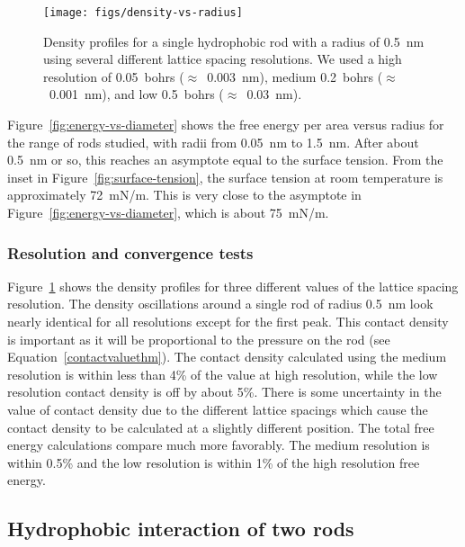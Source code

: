 \documentclass[letterpaper,twocolumn,amsmath,amssymb,prb]{revtex4-1}
\begin{document}
\begin{figure}
\begin{center}
\texttt{[image: figs/density-vs-radius]}
\end{center}
\caption{ Density profiles for 
a single hydrophobic rod with a radius of 0.5~nm using several different 
lattice spacing resolutions. We used a high resolution of 0.05~bohrs ($\approx$~0.003~nm), 
medium 0.2~bohrs ($\approx$~0.001~nm), and low 0.5~bohrs ($\approx$~0.03~nm).}
\label{fig:densityresolution}
\end{figure}

Figure~\ref{fig:energy-vs-diameter} shows the free energy per area versus
radius for the range of rods studied, with radii from 0.05~nm to 1.5~nm. After 
about 0.5~nm or so, this reaches
an asymptote equal to the surface tension. From the inset in 
Figure~\ref{fig:surface-tension}, the surface tension at room 
temperature is approximately 72~mN/m. This is very close to the 
asymptote in Figure~\ref{fig:energy-vs-diameter}, which is about 75~mN/m. 

\subsubsection{Resolution and convergence tests}
Figure~\ref{fig:densityresolution} shows the density profiles for three
different values of the lattice spacing resolution. The density oscillations
around a single rod of radius 0.5~nm look nearly identical for all resolutions
except for the first peak. This contact density is important as it will be
proportional to the pressure on the rod (see Equation~\ref{contactvaluethm}). The contact
density calculated using the medium resolution is within less than 4\% of the
value at high resolution, while the low resolution contact density is off by
about 5\%. There is some uncertainty in the value of contact density due to the
different lattice spacings which cause the contact density to be calculated
at a slightly different position. The total free energy calculations compare much more
favorably. The medium resolution is within 0.5\% and the low resolution is
within 1\% of the high resolution free energy.

\subsection{Hydrophobic interaction of two rods}
\end{document}
